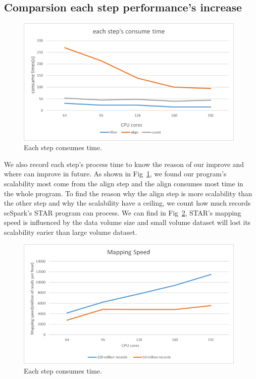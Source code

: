 \documentclass[runningheads]{llncs}
\begin{document}
\subsection{Comparsion each step performance's increase}
\begin{figure}
  \includegraphics[width=\textwidth]{fig5.png}
  \caption{Each step consumes time.} \label{fig5}
\end{figure}
We also record each step's process time to know the reason of our improve and where can improve in future.
As shown in Fig~\ref{fig5}, we found our program's scalability most come from the align step and the align consumes most time in the whole program.
To find the reason why the align step is more scalability than the other step and why the scalability have a ceiling, we count how much records scSpark's STAR program can process.
We can find in Fig~\ref{fig6}, STAR's mapping speed is influenced by the data volume size and small volume dataset will lost its scalability earier than large volume dataset.
\begin{figure}
  \includegraphics[width=\textwidth]{fig6.png}
  \caption{Each step consumes time.} \label{fig6}
\end{figure}
\end{document}
